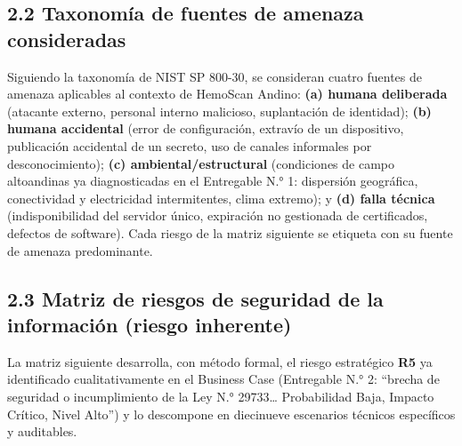 \documentclass[11pt,a4paper]{article}
\begin{document}
\subsection{2.2 Taxonomía de fuentes de amenaza consideradas}\label{taxonomuxeda-de-fuentes-de-amenaza-consideradas}

Siguiendo la taxonomía de NIST SP 800-30, se consideran cuatro fuentes de amenaza aplicables al contexto de HemoScan Andino: \textbf{(a) humana deliberada} (atacante externo, personal interno malicioso, suplantación de identidad); \textbf{(b) humana accidental} (error de configuración, extravío de un dispositivo, publicación accidental de un secreto, uso de canales informales por desconocimiento); \textbf{(c) ambiental/estructural} (condiciones de campo altoandinas ya diagnosticadas en el Entregable N.° 1: dispersión geográfica, conectividad y electricidad intermitentes, clima extremo); y \textbf{(d) falla técnica} (indisponibilidad del servidor único, expiración no gestionada de certificados, defectos de software). Cada riesgo de la matriz siguiente se etiqueta con su fuente de amenaza predominante.

\subsection{2.3 Matriz de riesgos de seguridad de la información (riesgo inherente)}\label{matriz-de-riesgos-de-seguridad-de-la-informaciuxf3n-riesgo-inherente}

La matriz siguiente desarrolla, con método formal, el riesgo estratégico \textbf{R5} ya identificado cualitativamente en el Business Case (Entregable N.° 2: ``brecha de seguridad o incumplimiento de la Ley N.° 29733\ldots{} Probabilidad Baja, Impacto Crítico, Nivel Alto'') y lo descompone en diecinueve escenarios técnicos específicos y auditables.
\end{document}
